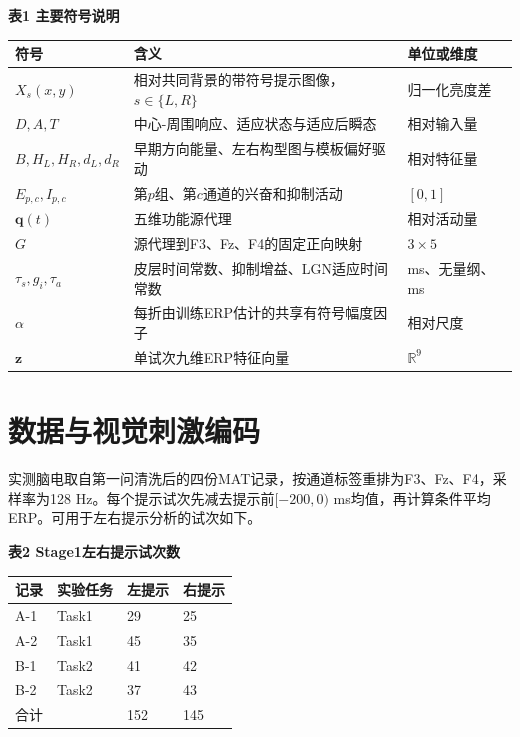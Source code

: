 \newpage

\textbf{表1 主要符号说明}

\begin{longtable}[]{@{}lll@{}}
\toprule
符号 & 含义 & 单位或维度 \\
\midrule
\endhead
\(X_s(x,y)\) & 相对共同背景的带符号提示图像，\(s\in\{L,R\}\) & 归一化亮度差 \\
\(D,A,T\) & 中心-周围响应、适应状态与适应后瞬态 & 相对输入量 \\
\(B,H_L,H_R,d_L,d_R\) & 早期方向能量、左右构型图与模板偏好驱动 & 相对特征量 \\
\(E_{p,c},I_{p,c}\) & 第\(p\)组、第\(c\)通道的兴奋和抑制活动 & \([0,1]\) \\
\(\mathbf q(t)\) & 五维功能源代理 & 相对活动量 \\
\(G\) & 源代理到F3、Fz、F4的固定正向映射 & \(3\times5\) \\
\(\tau_s,g_i,\tau_a\) & 皮层时间常数、抑制增益、LGN适应时间常数 & ms、无量纲、ms \\
\(\alpha\) & 每折由训练ERP估计的共享有符号幅度因子 & 相对尺度 \\
\(\mathbf z\) & 单试次九维ERP特征向量 & \(\mathbb R^9\) \\
\bottomrule
\end{longtable}

\hypertarget{ux6570ux636eux4e0eux89c6ux89c9ux523aux6fc0ux7f16ux7801}{%
\section{数据与视觉刺激编码}\label{ux6570ux636eux4e0eux89c6ux89c9ux523aux6fc0ux7f16ux7801}}

实测脑电取自第一问清洗后的四份MAT记录，按通道标签重排为F3、Fz、F4，采样率为128 Hz。每个提示试次先减去提示前\([-200,0)\) ms均值，再计算条件平均ERP。可用于左右提示分析的试次如下。

\textbf{表2 Stage1左右提示试次数}

\begin{longtable}[]{@{}llll@{}}
\toprule
记录 & 实验任务 & 左提示 & 右提示 \\
\midrule
\endhead
A-1 & Task1 & 29 & 25 \\
A-2 & Task1 & 45 & 35 \\
B-1 & Task2 & 41 & 42 \\
B-2 & Task2 & 37 & 43 \\
合计 & & 152 & 145 \\
\bottomrule
\end{longtable}

